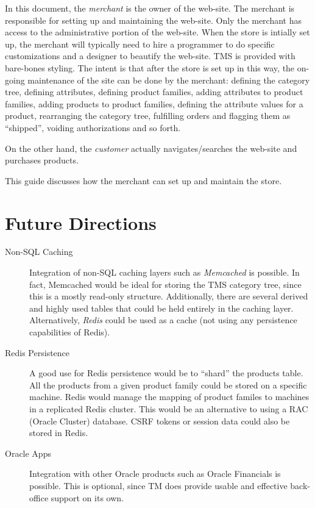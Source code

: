 \documentclass[letterpaper, 12pt]{article}
\begin{document}
In this document, the {\em merchant} is the owner of the web-site.  The merchant is responsible for setting up and maintaining the web-site.  Only the merchant has access to the administrative portion of the web-site.  When the store is intially set up, the merchant will typically need to hire a programmer to do specific customizations and a designer to beautify the web-site.  TMS is provided with bare-bones styling.  The intent is that after the store is set up in this way,  the on-going maintenance of the site can be done by the merchant: defining the category tree,
defining attributes, defining product families, adding attributes to product families,  adding products to product families, defining the attribute values for a product, rearranging the category tree, fulfilling orders and flagging them as ``shipped'', voiding authorizations and so forth. 

On the other hand, the {\em customer} actually navigates/searches the web-site and purchases products. 

This guide discusses how the merchant can set up and maintain the store.

\section{Future Directions}
\begin{description}
\item [Non-SQL Caching] Integration of non-SQL caching layers such as {\em Memcached} is possible.  In fact, Memcached would be ideal for storing the TMS category tree, since this is a mostly read-only structure.  Additionally, there are several derived and highly used tables that could be held entirely in the caching layer. Alternatively, {\em Redis} could be used as a cache (not using any persistence capabilities of Redis).
\item [Redis Persistence]  A good use for Redis persistence would be to ``shard'' the products table.  All the products from a given product family could be stored on a specific machine.  Redis would manage the mapping of product familes to machines in a replicated Redis cluster.  This would be an alternative to using a RAC (Oracle Cluster) database.  CSRF tokens or session data could also be stored in Redis.
\item[Oracle Apps] Integration with other Oracle products such as Oracle Financials is possible.  This is optional, since TM does provide usable and effective back-office support on its own.
\end{description}
\end{document}
